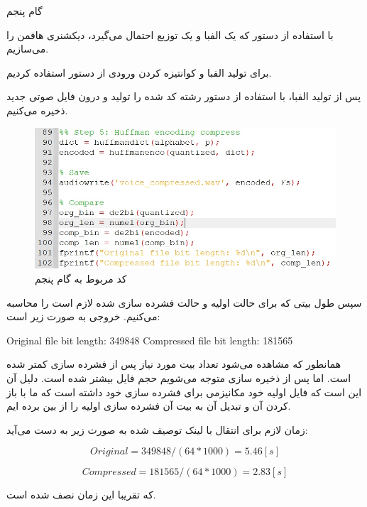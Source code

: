 \Problem
{گام پنجم}
{
با استفاده از دستور  که یک الفبا و یک توزیع احتمال می‌گیرد، دیکشنری هافمن را می‌سازیم.

برای تولید الفبا و کوانتیزه کردن ورودی از دستور  
استفاده کردیم.

پس از تولید الفبا، با استفاده از دستور  
رشته کد شده را تولید و درون فایل صوتی جدید ذخیره می‌کنیم.

\begin{figure}[H]
    \includegraphics[width=15cm]{Images/step_5_code.jpg}
    \centering
    \caption{کد مربوط به گام پنجم}
\end{figure}

سپس طول بیتی که برای حالت اولیه و حالت فشرده سازی شده لازم است را محاسبه می‌کنیم. خروجی به صورت زیر است:

\begin{latin}
\newline
Original file bit length: 349848
\newline
Compressed file bit length: 181565
\newline
\end{latin}
}

همانطور که مشاهده می‌شود تعداد بیت مورد نیاز پس از فشرده سازی کمتر شده است. اما پس از ذخیره سازی متوجه می‌شویم حجم فایل بیشتر شده است. دلیل آن این است که فایل اولیه خود مکانیزمی برای فشرده سازی خود داشته است که ما با باز کردن آن و تبدیل آن به بیت آن فشرده سازی اولیه را از بین برده ایم.

زمان لازم برای انتقال با لینک توصیف شده به صورت زیر به دست می‌آید:

\begin{equation*}
    Original = 349848 / (64 * 1000) = 5.46 [s]
\end{equation*}

\begin{equation*}
    Compressed = 181565 / (64 * 1000) = 2.83 [s]
\end{equation*}

که تقریبا این زمان نصف شده است.